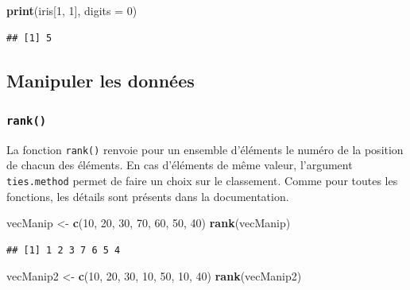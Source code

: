 \documentclass[]{book}
\newenvironment{Shaded}{\begin{snugshade}}{\end{snugshade}}
\newcommand{\DataTypeTok}[1]{\textcolor[rgb]{0.13,0.29,0.53}{#1}}
\newcommand{\DecValTok}[1]{\textcolor[rgb]{0.00,0.00,0.81}{#1}}
\newcommand{\KeywordTok}[1]{\textcolor[rgb]{0.13,0.29,0.53}{\textbf{#1}}}
\newcommand{\NormalTok}[1]{#1}
\newcommand{\StringTok}[1]{\textcolor[rgb]{0.31,0.60,0.02}{#1}}
\begin{document}
\begin{Shaded}
\begin{Highlighting}[]
\KeywordTok{print}\NormalTok{(iris[}\DecValTok{1}\NormalTok{, }\DecValTok{1}\NormalTok{], }\DataTypeTok{digits =} \DecValTok{0}\NormalTok{)}
\end{Highlighting}
\end{Shaded}

\begin{verbatim}
## [1] 5
\end{verbatim}

\hypertarget{manipuler-les-donnees}{%
\subsection{Manipuler les données}\label{manipuler-les-donnees}}

\hypertarget{l015rank}{%
\subsubsection{\texorpdfstring{\texttt{rank()}}{rank()}}\label{l015rank}}

La fonction \texttt{rank()} renvoie pour un ensemble d'éléments le numéro de la position de chacun des éléments. En cas d'éléments de même valeur, l'argument \texttt{ties.method} permet de faire un choix sur le classement. Comme pour toutes les fonctions, les détails sont présents dans la documentation.

\begin{Shaded}
\begin{Highlighting}[]
\NormalTok{vecManip <-}\StringTok{ }\KeywordTok{c}\NormalTok{(}\DecValTok{10}\NormalTok{, }\DecValTok{20}\NormalTok{, }\DecValTok{30}\NormalTok{, }\DecValTok{70}\NormalTok{, }\DecValTok{60}\NormalTok{, }\DecValTok{50}\NormalTok{, }\DecValTok{40}\NormalTok{)}
\KeywordTok{rank}\NormalTok{(vecManip)}
\end{Highlighting}
\end{Shaded}

\begin{verbatim}
## [1] 1 2 3 7 6 5 4
\end{verbatim}

\begin{Shaded}
\begin{Highlighting}[]
\NormalTok{vecManip2 <-}\StringTok{ }\KeywordTok{c}\NormalTok{(}\DecValTok{10}\NormalTok{, }\DecValTok{20}\NormalTok{, }\DecValTok{30}\NormalTok{, }\DecValTok{10}\NormalTok{, }\DecValTok{50}\NormalTok{, }\DecValTok{10}\NormalTok{, }\DecValTok{40}\NormalTok{)}
\KeywordTok{rank}\NormalTok{(vecManip2)}
\end{Highlighting}
\end{Shaded}
\end{document}
